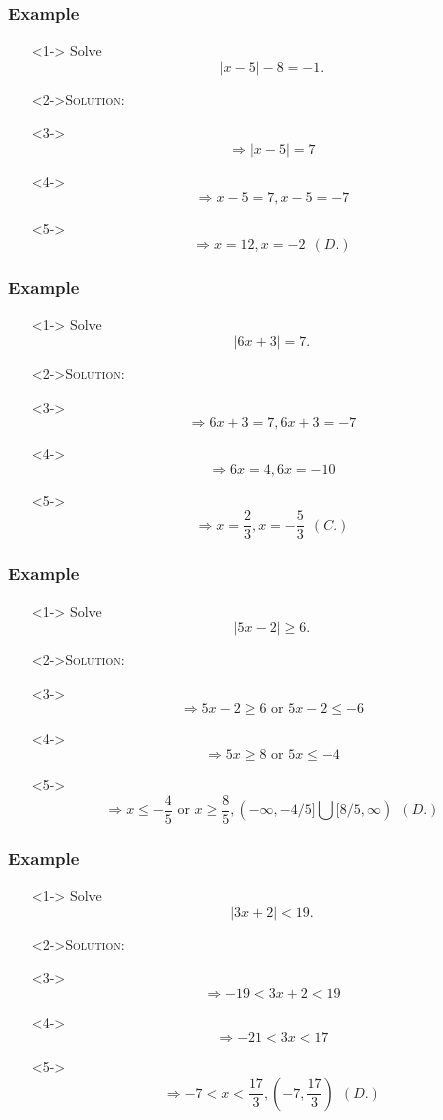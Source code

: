 \documentclass[handout]{beamer}
\begin{document}
\begin{frame}
	\frametitle{Example}
	\begin{enumerate}
		\item[]<1-> Solve \[ |x-5|-8=-1. \]
		\item[]<2->\textsc{Solution:}
		\item[]<3-> \[ \Rightarrow |x-5|=7 \]
    \item[]<4-> \[ \Rightarrow x-5=7, x-5=-7  \]
    \item[]<5-> \[ \Rightarrow x=12, x=-2 ~~(D.) \]
	\end{enumerate}
\end{frame}

\begin{frame}
	\frametitle{Example}
	\begin{enumerate}
		\item[]<1-> Solve \[ |6x+3|=7. \]
		\item[]<2->\textsc{Solution:}
		\item[]<3-> \[ \Rightarrow 6x+3=7, 6x+3=-7 \]
    \item[]<4-> \[ \Rightarrow 6x=4, 6x=-10  \]
    \item[]<5-> \[ \Rightarrow x=\frac{2}{3}, x=-\frac{5}{3} ~~(C.) \]
	\end{enumerate}
\end{frame}

\begin{frame}
	\frametitle{Example}
	\begin{enumerate}
		\item[]<1-> Solve \[ |5x-2| \geq 6. \]
		\item[]<2->\textsc{Solution:}
		\item[]<3-> \[ \Rightarrow 5x-2 \geq 6 \text{ or } 5x-2 \leq -6 \]
    \item[]<4-> \[ \Rightarrow 5x \geq 8 \text{ or } 5x \leq -4  \]
    \item[]<5-> \[ \Rightarrow x \leq -\frac{4}{5} \text{ or } x \geq \frac{8}{5}, (-\infty, -4/5] \bigcup [8/5, \infty) ~~(D.) \]
	\end{enumerate}
\end{frame}

\begin{frame}
	\frametitle{Example}
	\begin{enumerate}
		\item[]<1-> Solve \[ |3x+2| < 19. \]
		\item[]<2->\textsc{Solution:}
		\item[]<3-> \[ \Rightarrow -19<3x+2<19 \]
    \item[]<4-> \[ \Rightarrow -21<3x<17  \]
    \item[]<5-> \[ \Rightarrow -7<x<\frac{17}{3}, \left( -7, \frac{17}{3} \right) ~~(D.) \]
	\end{enumerate}
\end{frame}
\end{document}

